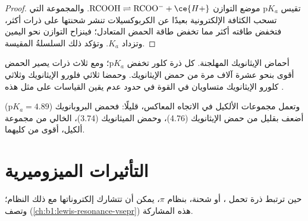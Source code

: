 \begin{proof}
تقيس $\mathrm{p}K_a$ موضع التوازن $\mathrm{RCOOH} \rightleftharpoons
\mathrm{RCOO^-} + \ce{H+}$. والمجموعة التي تسحب الكثافة الإلكترونية بعيدًا عن
الكربوكسيلات تنشر شحنتها على ذرات أكثر، فتخفض طاقته
أكثر مما تخفض طاقة الحمض المتعادل؛ فينزاح التوازن نحو
اليمين وتزداد $K_a$. وتؤكد ذلك السلسلةُ المقيسة.
\end{proof}

\begin{omfigure}

{\small أحماض الإيثانويك المهلجنة. كل ذرة كلور تخفض
$\mathrm{p}K_a$؛ ومع ثلاث ذرات يصير الحمض أقوى بنحو عشرة آلاف مرة
من حمض الإيثانويك. وحمضا ثلاثي فلورو الإيثانويك وثلاثي كلورو الإيثانويك
متساويان في القوة في حدود عدم يقين القياسات على مثل هذه .}
\end{omfigure}

وتعمل مجموعات الألكيل في الاتجاه المعاكس، قليلًا: فحمض البروبانويك ($\mathrm{p}K_a
= 4.89$) أضعف بقليل من حمض الإيثانويك (4.76)، وحمض الميثانويك
(3.74)، الخالي من مجموعة ألكيل، أقوى من كليهما.

\section{التأثيرات الميزوميرية}

حين ترتبط ذرة تحمل ، أو شحنة، بنظام $\pi$،
يمكن أن تتشارك إلكتروناتها مع ذلك النظام؛ وتصف 
(\cref{ch:b1:lewis-resonance-vsepr}) هذه المشاركة.

